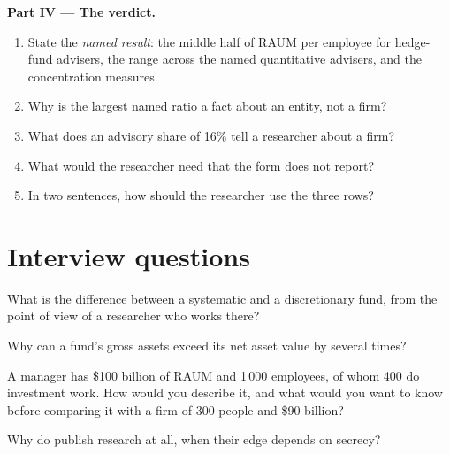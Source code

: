\begin{problem}
\medskip\noindent\textbf{Part IV --- The verdict.}
\begin{enumerate}[resume]
\item State the \emph{named result}: the middle half of RAUM per employee for hedge-fund advisers, the range across the
named quantitative advisers, and the concentration measures.
\item Why is the largest named ratio a fact about an entity, not a firm?
\item What does an advisory share of 16\% tell a researcher about a firm?
\item What would the researcher need that the form does not report?
\item In two sentences, how should the researcher use the three rows?
\end{enumerate}
\end{problem}

\section{Interview questions}

\begin{interviewq}\label{iq:in:quantitative-hedge-funds-and-systematic-managers:1}
What is the difference between a systematic and a discretionary fund, from the point of view of a researcher who works
there?
\end{interviewq}

\begin{interviewq}\label{iq:in:quantitative-hedge-funds-and-systematic-managers:2}
Why can a fund's gross assets exceed its net asset value by several times?
\end{interviewq}

\begin{interviewq}\label{iq:in:quantitative-hedge-funds-and-systematic-managers:3}
A manager has \$100 billion of RAUM and 1\,000 employees, of whom 400 do investment work. How would you describe it, and
what would you want to know before comparing it with a firm of 300 people and \$90 billion?
\end{interviewq}

\begin{interviewq}\label{iq:in:quantitative-hedge-funds-and-systematic-managers:4}
Why do  publish research at all, when their edge depends on secrecy?
\end{interviewq}

